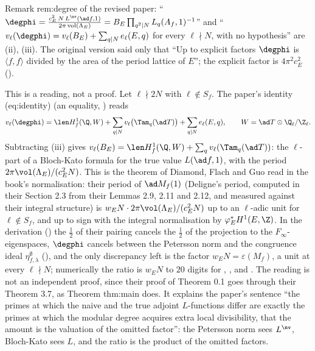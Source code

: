 \begin{paperlink}
Remark rem:degree of the revised paper: ``$\degphi=\frac{c_E^2\,N\,L^{\nv}(\ad f,1)}{2\pi\operatorname{vol}(\Lambda_E)}=B_E\prod_{q^2\mid N}L_q(A_f,1)^{-1}$'' and ``$v_\ell(\degphi)=v_\ell(B_E)+\sum_{q\mid N}e_\ell(E,q)$
for every $\ell\nmid N$, with no hypothesis'' are (ii), (iii). The original version said only that ``Up to explicit factors $\degphi$ is
$\langle f,f\rangle$ divided by the area of the period lattice of $E$''; the explicit factor is $4\pi^2c_E^2$ ().
\end{paperlink}

\begin{remark}\label{rem:lfunctions:bloch-kato-reading}
This is a reading, not a proof. Let $\ell\nmid2N$ with $\ell\notin S_f$. The paper's identity (eq:identity) (an equality, ) reads
\[
v_\ell(\degphi)=\len H^1_f(\Q,W)+\sum_{q\mid N}v_\ell\bigl(\Tam_q(\ad T)\bigr)+\sum_{q\mid N}e_\ell(E,q),\qquad W=\ad T\otimes\Q_\ell/\Z_\ell.
\]
Subtracting (iii) gives $v_\ell(B_E)=\len H^1_f(\Q,W)+\sum_qv_\ell(\Tam_q(\ad T))$: the $\ell$-part of a Bloch-Kato formula for the true value $L(\ad f,1)$,
with the period $2\pi\vol(\Lambda_E)/(c_E^2N)$. This is the theorem of Diamond, Flach and Guo \cite[Theorem 0.1]{DFG04} read in the book's normalisation: their period of
$\ad M_f(1)$ (Deligne's period, computed in their Section 2.3 from their Lemmas 2.9, 2.11 and 2.12, and measured against their integral structure) is $w_EN\cdot2\pi\vol(\Lambda_E)/(c_E^2N)$
up to an $\ell$-adic unit for $\ell\notin S_f$, and up to sign with the integral normalisation by $\varphi_E^*H^1(E,\Z)$. In the derivation () the $\frac12$ of their pairing
cancels the $\frac12$ of the projection to the $F_\infty$-eigenspaces, $\degphi$ cancels between the Petersson norm and the congruence ideal $\eta^\emptyset_{f,\lambda}$ (), and the
only discrepancy left is the factor $w_EN=\varepsilon(M_f)$, a unit at every $\ell\nmid N$; numerically the ratio is $w_EN$ to $20$ digits for , ,  and .
The reading is not an independent proof, since their proof of Theorem 0.1 goes through their Theorem 3.7, as Theorem thm:main does. It explains the paper's sentence ``the primes at which the
naive and the true adjoint $L$-functions differ are exactly the primes at which the modular degree acquires extra local divisibility, that the amount is the
valuation of the omitted factor'': the Petersson norm sees $L^{\nv}$, Bloch-Kato sees $L$, and the ratio is the product of the omitted factors.
\end{remark}

